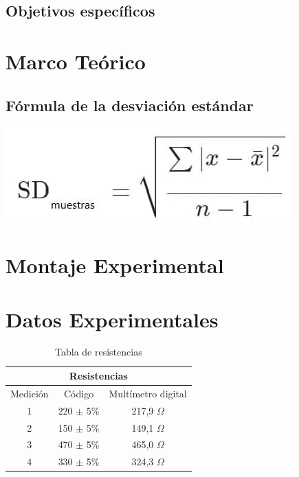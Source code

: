\documentclass[letterpaper, 12pt]{report}
\begin{document}
\subsection{Objetivos específicos}

\newpage

\section{Marco Teórico}

\subsection{Fórmula de la desviación  estándar}

\includegraphics[scale = .6]{./Images/FormulaDesviacionEstandar.png} \hfill \break{}~\cite{ImagenDesviacionEstandar}
\label{img:desviacionEstandar}


\section{Montaje Experimental}

\section{Datos Experimentales}

\begin{table}[h]
	\begin{center}
		\begin{tabular}{|c|c|c|}
			\multicolumn{3}{c}{Resistencias}              \\ \hline
			Medición & Código        & Multímetro digital \\ \hline
			1        & 220 $\pm$ 5\% & 217,9 $\Omega$     \\ \hline
			2        & 150 $\pm$ 5\% & 149,1 $\Omega$     \\ \hline
			3        & 470 $\pm$ 5\% & 465,0 $\Omega$     \\ \hline
			4        & 330 $\pm$ 5\% & 324,3 $\Omega$     \\ \hline
		\end{tabular}
		\caption{Tabla de resistencias}
		\label{tab:resistencias}
	\end{center}
\end{table}
\end{document}
